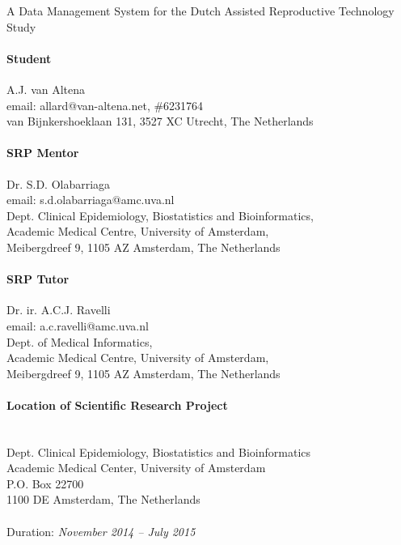 \thispagestyle{empty}

\begin{center}
	{\huge{A Data Management System for the Dutch Assisted Reproductive Technology Study}}
\end{center}
\bigskip

\paragraph{Student}
A.J. van Altena\\
email: allard@van-altena.net, \#6231764\\
van Bijnkershoeklaan 131, 3527 XC Utrecht, The Netherlands

\paragraph{SRP Mentor}
Dr. S.D. Olabarriaga\\
email: s.d.olabarriaga@amc.uva.nl\\
Dept. Clinical Epidemiology, Biostatistics and Bioinformatics,\\
Academic Medical Centre, University of Amsterdam,\\
Meibergdreef 9, 1105 AZ  Amsterdam, The Netherlands

\paragraph{SRP Tutor}
Dr. ir. A.C.J. Ravelli\\
email: a.c.ravelli@amc.uva.nl\\
Dept. of Medical Informatics,\\
Academic Medical Centre, University of Amsterdam,\\
Meibergdreef 9, 1105 AZ  Amsterdam, The Netherlands

\paragraph{Location of Scientific Research Project}\mbox{}\\
Dept. Clinical Epidemiology, Biostatistics and Bioinformatics \\
Academic Medical Center, University of Amsterdam \\
P.O. Box 22700 \\
1100 DE Amsterdam, The Netherlands\\
\mbox{}\\
Duration: \textit{November 2014 -- July 2015}

\clearpage
